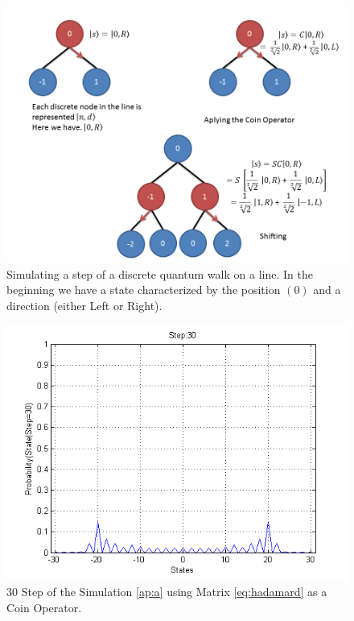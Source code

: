 \begin{figure}[h]
\centering 

\includegraphics[scale=0.50]{Figures/quantum_walk_line.png}
\caption{Simulating a step of a discrete quantum walk on a line. In the beginning we have a state characterized by the position $(0)$ and a direction (either Left or Right).}
\label{fig:qwl_tree}
\end{figure}




\begin{figure}[h]
\centering 
\includegraphics[scale=0.50]{Figures/quantum_walk_line_symetric.png}
\caption{30 Step of the Simulation \ref{ap:a} using Matrix \ref{eq:hadamard} as a Coin Operator.}
\label{fig:qwl_symetric}
\end{figure}

